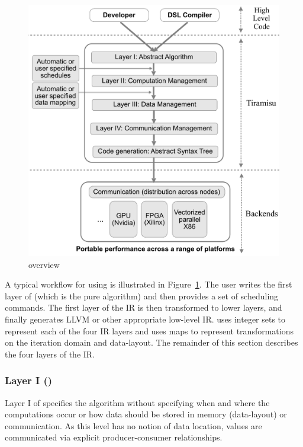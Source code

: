 \begin{figure}
 \includegraphics[scale=0.28]{./figures/fista.pdf}
 \vspace{-0.25cm}
 \caption{\framework overview}
 \label{fig:overview}
 \vspace{-0.5cm}
\end{figure}

A typical workflow for using \framework is illustrated in Figure~\ref{fig:overview}.  The user writes the first layer of \framework{} (which is the pure algorithm) and then provides a set of scheduling commands.  The first layer of the IR is then transformed to lower layers, and finally \framework{} generates LLVM or other appropriate low-level IR.
\framework{} uses integer sets to represent each of the four IR layers and uses maps to represent transformations on the iteration domain and data-layout.
The remainder of this section describes the four layers of the \framework IR.

\vspace{-0.25cm}
\subsubsection{Layer I (\Layerone)}
\label{layer1}

Layer I of \framework{} specifies the algorithm without specifying when and where the computations occur or how data should be stored in memory (data-layout) or communication. As this level has no notion of data location, values are communicated via explicit producer-consumer relationships.

